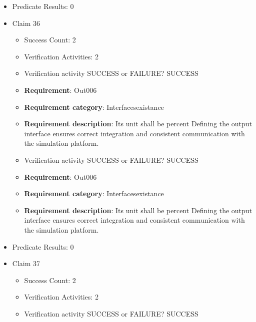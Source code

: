 \documentclass{article}
\begin{document}
\begin{itemize}
\begin{itemize}
					\item Verification activity SUCCESS or FAILURE? SUCCESS
		
						\item \textbf{Requirement}: Out005 
						\item \textbf{Requirement category}: Interfacesexistance 
						\item \textbf{Requirement description}: Its unit shall be Nm Defining the output interface ensures correct integration and consistent communication with the simulation platform.
					
				\end{itemize}
				
									    
				\item Predicate Results: 0

  				  \item Claim 36
				\begin{itemize}
			    	\item Success Count: 2 
			    	\item Verification Activities: 2
					\item Verification activity SUCCESS or FAILURE? SUCCESS
		
						\item \textbf{Requirement}: Out006 
						\item \textbf{Requirement category}: Interfacesexistance 
						\item \textbf{Requirement description}: Its unit shall be percent Defining the output interface ensures correct integration and consistent communication with the simulation platform.
					
					\item Verification activity SUCCESS or FAILURE? SUCCESS
		
						\item \textbf{Requirement}: Out006 
						\item \textbf{Requirement category}: Interfacesexistance 
						\item \textbf{Requirement description}: Its unit shall be percent Defining the output interface ensures correct integration and consistent communication with the simulation platform.
					
				\end{itemize}
				
									    
				\item Predicate Results: 0

  				  \item Claim 37
				\begin{itemize}
			    	\item Success Count: 2 
			    	\item Verification Activities: 2
					\item Verification activity SUCCESS or FAILURE? SUCCESS
		

\end{itemize}
\end{itemize}
\end{document}
